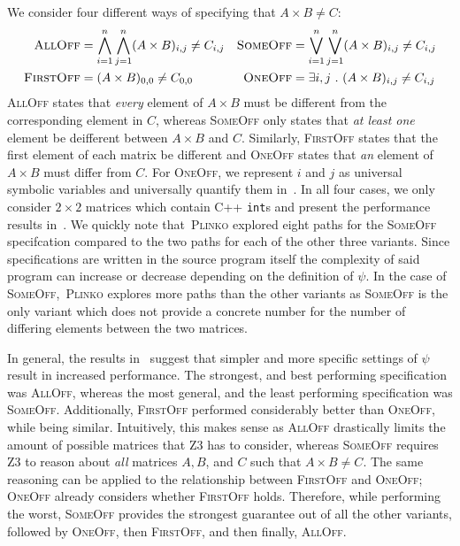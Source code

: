 \documentclass[acmsmall,review,anonymous]{acmart}\settopmatter{printfolios=true,printccs=false,printacmref=false}
\newcommand{\SYSTEM}{\textsc{Plinko}\xspace}
\begin{document}
We consider four different ways of specifying that $A \times B \neq C$:
\begin{align}
  \textsc{AllOff} &= \bigwedge_{i=1}^n\bigwedge_{j=1}^n (A\times B)_{i,j} \neq C_{i,j}&
  \textsc{SomeOff} &= \bigvee_{i=1}^n\bigvee_{j=1}^n (A\times B)_{i,j} \neq C_{i,j}\label{eq:someoff}\\
  \textsc{FirstOff} &= (A\times B)_{0,0} \neq C_{0,0}\nonumber&
  \textsc{OneOff} &= \exists i,j~.~(A\times B)_{i,j} \neq C_{i,j}\nonumber
\end{align}
\textsc{AllOff} states that \textit{every} element of $A \times B$ must be different from the corresponding element in $C$, whereas \textsc{SomeOff} only states that \textit{at least one} element be deifferent between $A \times B$ and $C$. Similarly, \textsc{FirstOff} states that the first element of each matrix be different and \textsc{OneOff} states that \textit{an} element of $A \times B$ must differ from $C$. For \textsc{OneOff}, we represent $i$ and $j$ as universal symbolic variables and universally quantify them in~.
% 
In all four cases, we only consider $2 \times 2$ matrices which contain C++ \texttt{int}s and present the performance results in~.
%
We quickly note that~\SYSTEM explored eight paths for the \textsc{SomeOff} specifcation compared to the two paths for each of the other three variants.
%
Since specifications are written in the source program itself the complexity of said program can increase or decrease depending on the definition of $\psi$.
%
In the case of \textsc{SomeOff},~\SYSTEM explores more paths than the other variants as \textsc{SomeOff} is the only variant which does not provide a concrete number for the number of differing elements between the two matrices.


In general, the results in~ suggest that simpler and more specific settings of $\psi$ result in increased performance.
%
The strongest, and best performing specification was \textsc{AllOff}, whereas the most general, and the least performing specification was \textsc{SomeOff}.
% 
Additionally, \textsc{FirstOff} performed considerably better than \textsc{OneOff}, while being similar.
% 
Intuitively, this makes sense as \textsc{AllOff} drastically limits the amount of possible matrices that Z3 has to consider, whereas \textsc{SomeOff} requires Z3 to reason about \textit{all} matrices $A,B$, and $C$ such that $A \times B \neq C$.
%
The same reasoning can be applied to the relationship between \textsc{FirstOff} and \textsc{OneOff}; \textsc{OneOff} already considers whether \textsc{FirstOff} holds.
% 
Therefore, while performing the worst, \textsc{SomeOff} provides the strongest guarantee out of all the other variants, followed by \textsc{OneOff}, then \textsc{FirstOff}, and then finally, \textsc{AllOff}.
\end{document}
